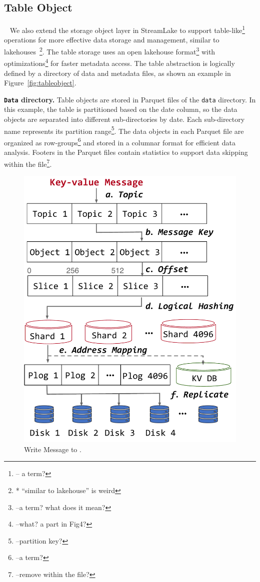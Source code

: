 \subsection{Table Object}~\label{subsec:tableobject}
We also extend the storage object layer in StreamLake to support table-like\footnote{-- a term?} operations for more effective data storage and management, similar to lakehouses~\cite{}\footnote{* ``similar to lakehouse'' is weird}. The table storage uses an open lakehouse format\footnote{--a term? what does it mean?} with optimizations\footnote{--what? a part in Fig4?} for faster metadata access. The table abstraction is logically defined by a directory of data and metadata files, as shown an example  in Figure~\ref{fig:tableobject}.

\noindent \textbf{\texttt{Data} directory.} Table objects are stored in Parquet files of the \texttt{data} directory. In this example, the table is partitioned based on the date column, so the data objects are separated into different sub-directories by date. Each sub-directory name represents its partition range\footnote{--partition key?}. The data objects in each Parquet file are organized as row-groups\footnote{--a term?} and stored in a columnar format for efficient data analysis. Footers in the Parquet files contain statistics to support data skipping within the file\footnote{--remove within the file?}.

\begin{figure}[htbp]

	\includegraphics[scale=0.3]{figures/write}
	\centering
	\vspace{-1em}
	\caption{Write Message to \sys.}
	\label{fig:write}
	\vspace{-1em}
\end{figure}


